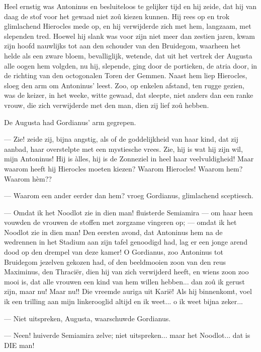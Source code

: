 \documentclass[a4paper, 12pt, oneside, dutch]{article}
\begin{document}
Heel ernstig was Antoninus en besluiteloos te gelijker tijd en hij zeide, dat hij van daag de stof voor het gewaad niet zoû kiezen kunnen. Hij rees op en trok glimlachend Hierocles mede op, en hij verwijderde zich met hem, langzaam, met slependen tred. Hoewel hij slank was voor zijn niet meer dan zestien jaren, kwam zijn hoofd nauwlijks tot aan den schouder van den Bruidegom, waarheen het helde als een zware bloem, bevalliglijk, wetende, dat uit het vertrek der Augusta alle oogen hem volgden, nu hij, slepende, ging door de portieken, de atria door, in de richting van den octogonalen Toren der Gemmen. Naast hem liep Hierocles, sloeg den arm om Antoninus' leest. Zoo, op enkelen afstand, ten rugge gezien, was de keizer, in het weeke, witte gewaad, dat sleepte, niet anders dan een ranke vrouw, die zich verwijderde met den man, dien zij lief zoû hebben.

De Augusta had Gordianus' arm gegrepen.

--- Zie! zeide zij, bijna angstig, als of de goddelijkheid van haar kind, dat zij aanbad, haar overstelpte met een mystiesche vrees. Zie, hij is wat hij zijn wil, mijn Antoninus! Hij is àlles, hij is de Zonneziel in heel haar veelvuldigheid! Maar waarom heeft hij Hierocles moeten kiezen? Waarom Hierocles! Waarom hem? Waarom hèm??

--- Waarom een ander eerder dan hem? vroeg Gordianus, glimlachend sceptiesch.

--- Omdat ik het Noodlot zie in dien man! fluisterde Semiamira --- om haar heen vouwden de vrouwen de stoffen met zorgzame vingeren op; --- omdat ik het Noodlot zie in dien man! Den eersten avond, dat Antoninus hem na de wedrennen in het Stadium aan zijn tafel genoodigd had, lag er een jonge arend dood op den drempel van deze kamer! O Gordianus, zoo Antoninus tot Bruidegom jezelven gekozen had, of den beeldmooien zoon van den reus Maximinus, den Thraciër, dien hij van zich verwijderd heeft, en wiens zoon zoo mooi is, dat alle vrouwen een kind van hem willen hebben... dan zoû ik gerust zijn, maar nu! Maar nu!! Die vreemde auriga uit Karië! Als hij binnenkomt, voel ik een trilling aan mijn linkerooglid altijd en ik weet... o ik weet bijna zeker...

--- Niet uitspreken, Augusta, waarschuwde Gordianus.

--- Neen! huiverde Semiamira zelve; niet uitspreken... maar het Noodlot... dat is DIE man!
\end{document}
